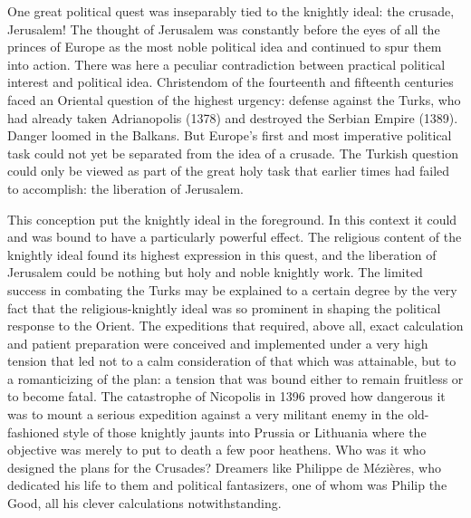 One great political quest was inseparably tied to the knightly ideal:
the crusade, Jerusalem! The thought of Jerusalem was constantly before
the eyes of all the princes of Europe as the most noble political idea
and continued to spur them into action. There was here a peculiar
contradiction between practical political interest and political idea.
Christendom of the fourteenth and fifteenth centuries faced an Oriental
question of the highest urgency: defense against the Turks, who had
already taken Adrianopolis (1378) and destroyed the Serbian Empire
(1389). Danger loomed in the Balkans. But Europe's first and most
imperative political task could not yet be separated from the idea of a
crusade. The Turkish question could only be viewed as part of the great
holy task that earlier times had failed to accomplish: the liberation of
Jerusalem.

This conception put the knightly ideal in the foreground. In this
context it could and was bound to have a particularly powerful effect.
The religious content of the knightly ideal found its highest expression
in this quest, and the liberation of Jerusalem could be nothing but holy
and noble knightly work. The limited success in combating the Turks may
be explained to a certain degree by the very fact that the
religious-knightly ideal was so prominent in shaping the political
response to the Orient. The expeditions that required, above all, exact
calculation and patient preparation were conceived and implemented under
a very high tension that led not to a calm consideration of that which
was attainable, but to a romanticizing of the plan: a tension that was
bound either to remain fruitless or to become fatal. The catastrophe of
Nicopolis in 1396 proved how dangerous it was to mount a serious
expedition against a very militant enemy in the old-fashioned style of
those knightly
\protect\hypertarget{10_Chapter_Three__THE_HEROIC_DREAM.xhtmlux5cux23page_106}{}{}jaunts
into Prussia or Lithuania where the objective was merely to put to death
a few poor heathens. Who was it who designed the plans for the Crusades?
Dreamers like Philippe de Mézières, who dedicated his life to them and
political fantasizers, one of whom was Philip the Good, all his clever
calculations notwithstanding.

